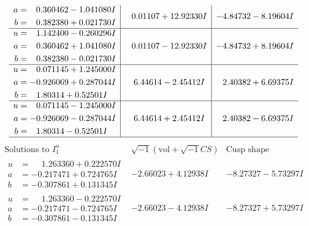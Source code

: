 \documentclass[1p]{elsarticle_modified}
\theoremstyle{definition}
\newcommand{\I}{\sqrt{-1}}
\begin{document}
$$\begin{array}{c|c|c}
\begin{aligned}
a &= \phantom{-}0.360462 - 1.041080 I \\
b &= \phantom{-}0.382380 + 0.021730 I\end{aligned}
 & \phantom{-}0.01107 + 12.92330 I & -4.84732 - 8.19604 I \\ \hline\begin{aligned}
u &= \phantom{-}1.142400 - 0.260296 I \\
a &= \phantom{-}0.360462 + 1.041080 I \\
b &= \phantom{-}0.382380 - 0.021730 I\end{aligned}
 & \phantom{-}0.01107 - 12.92330 I & -4.84732 + 8.19604 I \\ \hline\begin{aligned}
u &= \phantom{-}0.071145 + 1.245000 I \\
a &= -0.926069 + 0.287044 I \\
b &= \phantom{-}1.80314 + 0.52501 I\end{aligned}
 & \phantom{-}6.44614 - 2.45412 I & \phantom{-}2.40382 + 6.69375 I \\ \hline\begin{aligned}
u &= \phantom{-}0.071145 - 1.245000 I \\
a &= -0.926069 - 0.287044 I \\
b &= \phantom{-}1.80314 - 0.52501 I\end{aligned}
 & \phantom{-}6.44614 + 2.45412 I & \phantom{-}2.40382 - 6.69375 I\\
 \hline 
 \end{array}$$\newpage$$\begin{array}{c|c|c}  
\text{Solutions to }I^u_{1}& \I (\text{vol} + \sqrt{-1}CS) & \text{Cusp shape}\\
 \hline 
\begin{aligned}
u &= \phantom{-}1.263360 + 0.222570 I \\
a &= -0.217471 + 0.724765 I \\
b &= -0.307861 + 0.131345 I\end{aligned}
 & -2.66023 + 4.12938 I & -8.27327 - 5.73297 I \\ \hline\begin{aligned}
u &= \phantom{-}1.263360 - 0.222570 I \\
a &= -0.217471 - 0.724765 I \\
b &= -0.307861 - 0.131345 I\end{aligned}
 & -2.66023 - 4.12938 I & -8.27327 + 5.73297 I \\ \hline\begin{aligned}

\end{aligned}
\end{array}$$
\end{document}
